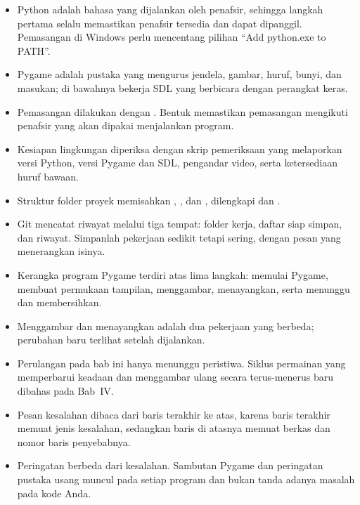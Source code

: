
\begin{rangkumanbox}
\begin{itemize}
  \item Python adalah bahasa yang dijalankan oleh penafsir, sehingga langkah
        pertama selalu memastikan penafsir tersedia dan dapat dipanggil.
        Pemasangan di Windows perlu mencentang pilihan ``Add python.exe to
        PATH''.
  \item Pygame adalah pustaka yang mengurus jendela, gambar, huruf, bunyi,
        dan masukan; di bawahnya bekerja SDL yang berbicara dengan perangkat
        keras.
  \item Pemasangan dilakukan dengan . Bentuk
         memastikan pemasangan mengikuti penafsir yang akan
        dipakai menjalankan program.
  \item Kesiapan lingkungan diperiksa dengan skrip pemeriksaan yang
        melaporkan versi Python, versi Pygame dan SDL, pengandar video, serta
        ketersediaan huruf bawaan.
  \item Struktur folder proyek memisahkan , , dan
        , dilengkapi  dan .
  \item Git mencatat riwayat melalui tiga tempat: folder kerja, daftar siap
        simpan, dan riwayat. Simpanlah pekerjaan sedikit tetapi sering, dengan
        pesan yang menerangkan isinya.
  \item Kerangka program Pygame terdiri atas lima langkah: memulai Pygame,
        membuat permukaan tampilan, menggambar, menayangkan, serta menunggu
        dan membersihkan.
  \item Menggambar dan menayangkan adalah dua pekerjaan yang berbeda;
        perubahan baru terlihat setelah  dijalankan.
  \item Perulangan pada bab ini hanya menunggu peristiwa. Siklus permainan
        yang memperbarui keadaan dan menggambar ulang secara terus-menerus
        baru dibahas pada Bab~IV.
  \item Pesan kesalahan dibaca dari baris terakhir ke atas, karena baris
        terakhir memuat jenis kesalahan, sedangkan baris di atasnya memuat
        berkas dan nomor baris penyebabnya.
  \item Peringatan berbeda dari kesalahan. Sambutan Pygame dan peringatan
        pustaka usang muncul pada setiap program dan bukan tanda adanya
        masalah pada kode Anda.
\end{itemize}
\end{rangkumanbox}
